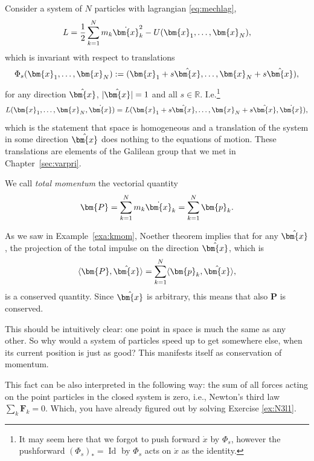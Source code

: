 \documentclass[english,fontsize=11pt,paper=a5,oneside]{scrbook}
\newcommand{\R}{\mathbb{R}}
\newcommand{\bx}{\bm{x}}
\newcommand{\lag}{\langle}
\newcommand{\rag}{\rangle}
\DeclareMathOperator{\Id}{Id}
\theoremstyle{definition}
\begin{document}
Consider a system of $N$ particles with lagrangian \eqref{eq:mechlag},
\begin{equation}
  L = \frac12 \sum_{k=1}^N m_k \dot \bx_k^2 - U(\bx_1, \ldots, \bx_N),
\end{equation}
which is invariant with respect to translations
\begin{equation}
  \Phi_s(\bx_1, \ldots, \bx_N) := (\bx_1 + s \hat \bx,\ldots, \bx_N + s \hat \bx),
\end{equation}
for any direction $\hat\bx$, $|\hat\bx|=1$ and all $s\in\R$. I.e.\footnote{It may seem here that we forgot to push forward $\dot x$ by $\Phi_s$, however the pushforward $(\Phi_s)_* = \Id$ by $\Phi_s$ acts on $\dot x$ as the identity.}
\begin{equation}
  L(\bx_1, \ldots, \bx_N, \dot \bx) = L(\bx_1 + s \hat\bx, \ldots, \bx_N + s \hat\bx, \dot \bx),
\end{equation}
which is the statement that space is homogeneous and a translation of the system in some direction $\hat\bx$ does nothing to the equations of motion. These translations are elements of the Galilean group that we met in Chapter~\ref{sec:varpri}.

We call \emph{total momentum} the vectorial quantity
\begin{equation}
  \bm{P} = \sum_{k=1}^N m_k \dot \bx_k = \sum_{k=1}^N \bm{p}_k.
\end{equation}

As we saw in Example~\ref{exa:kmom}, Noether theorem implies that for any $\hat\bx$, the projection of the total impulse on the direction $\hat\bx$, which is
\begin{equation}
  \lag\bm{P}, \hat\bx\rag = \sum_{k=1}^N \lag \bm{p}_k, \hat\bx\rag,
\end{equation}
is a conserved quantity.
Since $\hat\bx$ is arbitrary, this means that also $\bm{P}$ is conserved.

This should be intuitively clear: one point in space is much the same as any other. So why would a system of particles speed up to get somewhere else, when its current position is just as good? This manifests itself as conservation of momentum.

This fact can be also interpreted in the following way: the sum of all forces acting on the point particles in the closed system is zero, i.e., Newton's third law $\sum_k \bm{F}_k = 0$. Which, you have already figured out by solving Exercise \ref{ex:N3l1}.
\end{document}
